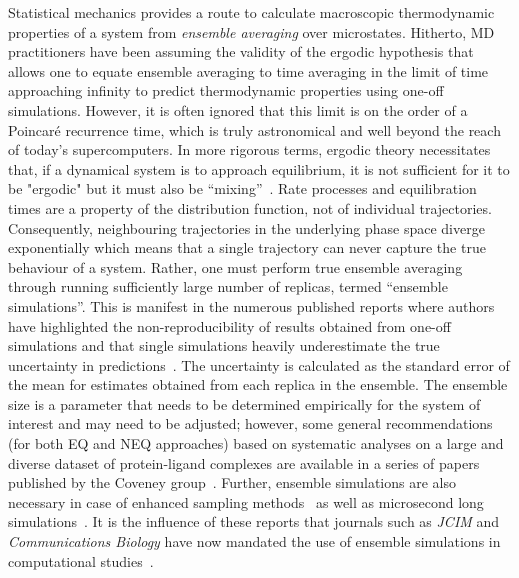 \documentclass[9pt,bestpractices]{livecoms}
\begin{document}
Statistical mechanics provides a route to calculate macroscopic thermodynamic properties of a system from \textit{ensemble averaging} over microstates. Hitherto, MD practitioners have been assuming the validity of the ergodic hypothesis that allows one to equate ensemble averaging to time averaging in the limit of time approaching infinity to predict thermodynamic properties using one-off simulations. However, it is often ignored that this limit is on the order of a Poincaré recurrence time, which is truly astronomical and well beyond the reach of today's supercomputers. In more rigorous terms, ergodic theory necessitates that, if a dynamical system is to approach equilibrium, it is not sufficient for it to be "ergodic" but it must also be ``mixing''~\cite{coveney2016, MDbook2025}. Rate processes and equilibration times are a property of the distribution function, not of individual trajectories. Consequently, neighbouring trajectories in the underlying phase space diverge exponentially which means that a single trajectory can never capture the true behaviour of a system. Rather, one must perform true ensemble averaging through running sufficiently large number of replicas, termed ``ensemble simulations''. This is manifest in the numerous published reports where authors have highlighted the non-reproducibility of results obtained from one-off simulations and that single simulations heavily underestimate the true uncertainty in predictions~\cite{wan2020fep+, wan2021uq, vassaux2021, gapsys2020large, wade2022, bhati2017, bhati2022, bhati2025, wan2023eqvsneq, bhati2018, bhati2019}. The uncertainty is calculated as the standard error of the mean for estimates obtained from each replica in the ensemble. The ensemble size is a parameter that needs to be determined empirically for the system of interest and may need to be adjusted; however, some general recommendations (for both EQ and NEQ approaches) based on systematic analyses on a large and diverse dataset of protein-ligand complexes are available in a series of papers published by the Coveney group~\cite{bhati2017, bhati2018, bhati2019, bhati2022, wan2023eqvsneq, bhati2025}. Further, ensemble simulations are also necessary in case of enhanced sampling methods~\cite{bhati2018} as well as microsecond long simulations~\cite{bhati2023}. It is the influence of these reports that journals such as \textit{JCIM} and \textit{Communications Biology} have now mandated the use of ensemble simulations in computational studies~\cite{wan2023}. 
\end{document}
